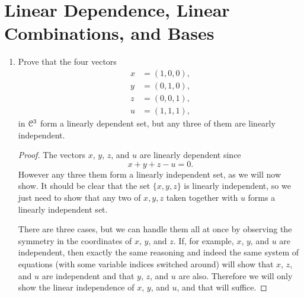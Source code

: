 \section{Linear Dependence, Linear Combinations, and Bases}

\begin{enumerate}
\item Prove that the four vectors
  \begin{align*}
    x &= (1, 0, 0), \\
    y &= (0, 1, 0), \\
    z &= (0, 0, 1), \\
    u &= (1, 1, 1),
  \end{align*}
  in $\mathcal{C}^3$ form a linearly dependent set, but any three of them are
  linearly independent.
  \begin{proof}
    The vectors $x$, $y$, $z$, and $u$ are linearly dependent since
    \begin{equation*}
      x + y + z - u = 0.
    \end{equation*}
    However any three them form a linearly independent set, as we will
    now show. It should be clear that the set $\{x,y,z\}$ is linearly
    independent, so we just need to show that any two of $x,y,z$ taken
    together with $u$ forms a linearly independent set.

    There are three cases, but we can handle them all at once by
    observing the symmetry in the coordinates of $x$, $y$, and
    $z$. If, for example, $x$, $y$, and $u$ are independent, then
    exactly the same reasoning and indeed the same system of equations
    (with some variable indices switched around) will show that $x$,
    $z$, and $u$ are independent and that $y$, $z$, and $u$ are
    also. Therefore we will only show the linear independence of $x$,
    $y$, and $u$, and that will suffice.


\end{proof}
\end{enumerate}
